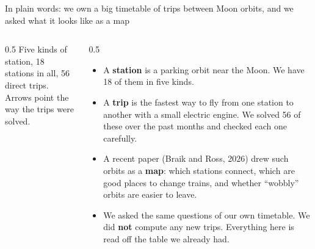 \documentclass[aspectratio=169,10pt]{beamer}
\begin{document}
\begin{frame}{In plain words: we own a big timetable of trips between Moon orbits, and we asked what it looks like as a map}
\begin{columns}[T]
\begin{column}{0.5\textwidth}
      \vspace{4pt}
      {\footnotesize Five kinds of station, 18 stations in all, 56 direct trips.\\ Arrows point the way the trips were solved.}
    \end{column}
    \begin{column}{0.5\textwidth}
      \small
      \begin{itemize}
        \setlength\itemsep{6pt}
        \item A \textbf{station} is a parking orbit near the Moon. We have 18 of them in five kinds.
        \item A \textbf{trip} is the fastest way to fly from one station to another with a small electric engine. We solved 56 of these over the past months and checked each one carefully.
        \item A recent paper (Braik and Ross, 2026) drew such orbits as a \textbf{map}: which stations connect, which are good places to change trains, and whether ``wobbly'' orbits are easier to leave.
        \item We asked the same questions of our own timetable. We did \textbf{not} compute any new trips. Everything here is read off the table we already had.
      \end{itemize}
    \end{column}
  \end{columns}
\end{frame}
\end{document}

